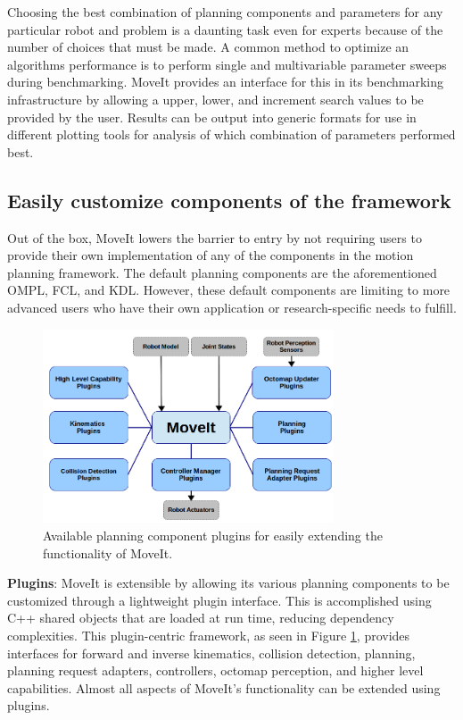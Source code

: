 \documentclass[10pt,journal,compsoc]{joser1}
\begin{document}
{Choosing the best combination of planning components and parameters for any particular robot and problem is a daunting task even for experts because of the number of choices that must be made\cite{cohen2012generic}. A common method to optimize an algorithms performance is to perform single and multivariable parameter sweeps during benchmarking. MoveIt provides an interface for this in its benchmarking infrastructure by allowing a upper, lower, and increment search values to be provided by the user. Results can be output into generic formats for use in different plotting tools for analysis of which combination of parameters performed best.

\subsection{Easily customize components of the framework}
\label{subsec:extensiblity}

Out of the box, MoveIt lowers the barrier to entry by not requiring users to provide their own implementation of any of the components in the motion planning framework. The default planning components are the aforementioned OMPL, FCL, and KDL. However, these default components are limiting to more advanced users who have their own application or research-specific needs to fulfill. 

\begin{figure}[!t]
\centering
\includegraphics[width=3.4in]{images/moveit_plugins}
\caption{Available planning component plugins for easily extending the functionality of MoveIt.}
\label{fig:moveit_plugins}
\end{figure}

{\bf Plugins}: MoveIt is extensible by allowing its various planning components to be customized through a lightweight plugin interface. This is accomplished using C++ shared objects that are loaded at run time, reducing dependency complexities. This plugin-centric framework, as seen in Figure \ref{fig:moveit_plugins}, provides interfaces for forward and inverse kinematics, collision detection, planning, planning request adapters, controllers, octomap perception, and higher level capabilities. Almost all aspects of MoveIt's functionality can be extended using plugins.

}
\end{document}
